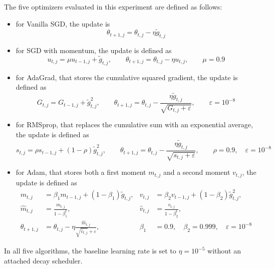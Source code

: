 The five optimizers evaluated in this experiment are defined as follows:
\begin{itemize}
    \item[-] for Vanilla SGD, the update is $$\theta_{t+1,j}=\theta_{t,j}-\eta\tilde{g}_{t,j}$$
    \item[-] for SGD with momentum, the update is defined as 
    \begin{equation*}
    u_{t,j}=\mu u_{t-1,j}+\tilde{g}_{t,j},
    \qquad
    \theta_{t+1,j}=\theta_{t,j}-\eta u_{t,j},
    \qquad \mu=0.9
    \end{equation*}
    \item[-] for AdaGrad, that stores the cumulative squared gradient, the update is defined as 
    \begin{equation*}
    G_{t,j}=G_{t-1,j}+\tilde{g}_{t,j}^{2},
    \qquad
    \theta_{t+1,j}=\theta_{t,j}-
    \frac{\eta\tilde{g}_{t,j}}{\sqrt{G_{t,j}+\varepsilon}},
    \qquad \varepsilon=10^{-8}
    \end{equation*}
    \item[-] for RMSprop, that replaces the cumulative sum with an exponential average, the update is defined as 
    \begin{equation*}
    s_{t,j}=\rho s_{t-1,j}+(1-\rho)\tilde{g}_{t,j}^{2},
    \qquad
    \theta_{t+1,j}=\theta_{t,j}-
    \frac{\eta\tilde{g}_{t,j}}{\sqrt{s_{t,j}+\varepsilon}},
    \qquad \rho=0.9,\quad \varepsilon=10^{-8}
    \end{equation*}
    \item[-] for Adam, that stores both a first moment $m_{t,j}$ and a second moment $v_{t,j}$, the update is defined as 
    \begin{equation*}
    \begin{aligned}
    m_{t,j}&=\beta_1m_{t-1,j}+(1-\beta_1)\tilde{g}_{t,j},
    &v_{t,j}&=\beta_2v_{t-1,j}+(1-\beta_2)\tilde{g}_{t,j}^{2},\\
    \hat{m}_{t,j}&=\frac{m_{t,j}}{1-\beta_1^t},
    &\hat{v}_{t,j}&=\frac{v_{t,j}}{1-\beta_2^t},\\
    \theta_{t+1,j}&=\theta_{t,j}-\eta
    \frac{\hat{m}_{t,j}}{\sqrt{\hat{v}_{t,j}}+\varepsilon},
    &\beta_1&=0.9,\quad \beta_2=0.999,\quad \varepsilon=10^{-8}
    \end{aligned}
    \end{equation*}
\end{itemize}
In all five algorithms, the baseline learning rate is set to $\eta=10^{-5}$ without an attached decay scheduler.\\

